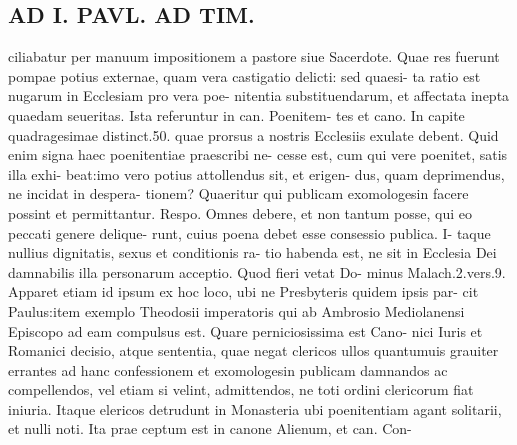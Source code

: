 \documentclass{article}
\begin{document}
\begin{pages}
\section*{AD I. PAVL. AD TIM. }
\marginpar{[ p.344 ]}ciliabatur per manuum impositionem a pastore siue Sacerdote. Quae res fuerunt pompae potius externae, quam vera castigatio delicti: sed quaesi- ta ratio est nugarum in Ecclesiam pro vera poe- nitentia substituendarum, et affectata inepta quaedam seueritas. Ista referuntur in can. Poenitem- tes et cano. In capite quadragesimae distinct.50. quae prorsus a nostris Ecclesiis exulate debent. Quid enim signa haec poenitentiae praescribi ne- cesse est, cum qui vere poenitet, satis illa exhi- beat:imo vero potius attollendus sit, et erigen- dus, quam deprimendus, ne incidat in despera- tionem? Quaeritur qui publicam exomologesin facere possint et permittantur. Respo. Omnes debere, et non tantum posse, qui eo peccati genere delique- runt, cuius poena debet esse consessio publica. I- taque nullius dignitatis, sexus et conditionis ra- tio habenda est, ne sit in Ecclesia Dei damnabilis illa personarum acceptio. Quod fieri vetat Do- minus Malach.2.vers.9. Apparet etiam id ipsum ex hoc loco, ubi ne Presbyteris quidem ipsis par- cit Paulus:item exemplo Theodosii imperatoris qui ab Ambrosio Mediolanensi Episcopo ad eam compulsus est. Quare perniciosissima est Cano- nici Iuris et Romanici decisio, atque sententia, quae negat clericos ullos quantumuis grauiter errantes ad hanc confessionem et exomologesin publicam damnandos ac compellendos, vel etiam si velint, admittendos, ne toti ordini clericorum fiat iniuria. Itaque elericos detrudunt in Monasteria ubi poenitentiam agant solitarii, et nulli noti. Ita prae ceptum est in canone Alienum, et can. Con- 

\end{pages}
\end{document}
